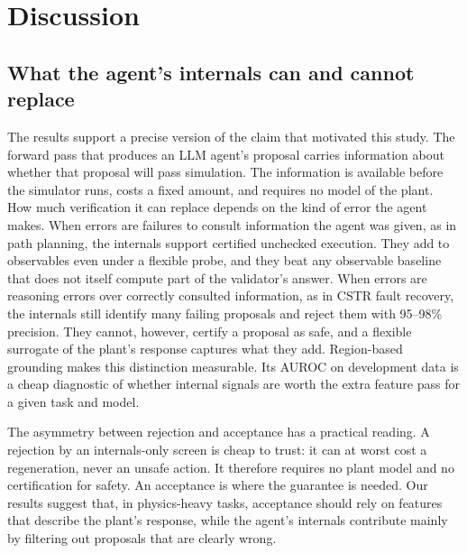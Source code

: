 \section{Discussion}\label{sec:discussion}

\subsection{What the agent's internals can and cannot replace}
The results support a precise version of the claim that motivated this study. The forward pass that produces an
LLM agent's proposal carries information about whether that proposal will pass simulation. The information is
available before the simulator runs, costs a fixed amount, and requires no model of the plant. How much
verification it can replace depends on the kind of error the agent makes. When errors are failures to consult
information the agent was given, as in path planning, the internals support certified unchecked execution. They
add to observables even under a flexible probe, and they beat any observable baseline that does not itself compute
part of the validator's answer. When errors are reasoning errors over correctly consulted information, as in CSTR
fault recovery, the internals still identify many failing proposals and reject them with 95--98\% precision. They
cannot, however, certify a proposal as safe, and a flexible surrogate of the plant's response captures what they
add. Region-based grounding makes
this distinction measurable. Its AUROC on development data is a cheap diagnostic of whether internal signals are
worth the extra feature pass for a given task and model.

The asymmetry between rejection and acceptance has a practical reading. A rejection by an internals-only screen
is cheap to trust: it can at worst cost a regeneration, never an unsafe action. It therefore requires no plant
model and no certification for safety. An acceptance is where the guarantee is needed. Our results suggest that,
in physics-heavy tasks, acceptance should rely on features that describe the plant's response, while the agent's
internals contribute mainly by filtering out proposals that are clearly wrong.

